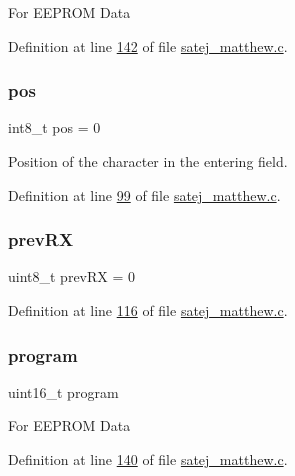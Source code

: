 For E\+E\+P\+R\+OM Data 

Definition at line \mbox{\hyperlink{satej__matthew_8c_source_l00142}{142}} of file \mbox{\hyperlink{satej__matthew_8c_source}{satej\+\_\+matthew.\+c}}.

\mbox{\label{satej__matthew_8c_a74d38abb1cb2f27f78ca059e24654b5e}} 
\subsubsection{\texorpdfstring{pos}{pos}}
{\footnotesize\ttfamily int8\+\_\+t pos = 0}

Position of the character in the entering field. 

Definition at line \mbox{\hyperlink{satej__matthew_8c_source_l00099}{99}} of file \mbox{\hyperlink{satej__matthew_8c_source}{satej\+\_\+matthew.\+c}}.

\mbox{\label{satej__matthew_8c_a568ff7da7fe7f4ceef3555f2465a3cc7}} 
\subsubsection{\texorpdfstring{prevRX}{prevRX}}
{\footnotesize\ttfamily uint8\+\_\+t prev\+RX = 0}



Definition at line \mbox{\hyperlink{satej__matthew_8c_source_l00116}{116}} of file \mbox{\hyperlink{satej__matthew_8c_source}{satej\+\_\+matthew.\+c}}.

\mbox{\label{satej__matthew_8c_a66ab3de6d3d072bd8495172c02a442f0}} 
\subsubsection{\texorpdfstring{program}{program}}
{\footnotesize\ttfamily uint16\+\_\+t program}

For E\+E\+P\+R\+OM Data 

Definition at line \mbox{\hyperlink{satej__matthew_8c_source_l00140}{140}} of file \mbox{\hyperlink{satej__matthew_8c_source}{satej\+\_\+matthew.\+c}}.

\mbox{\label{satej__matthew_8c_ab6c75a184c9e2f11ff1237e857250b3d}} 
